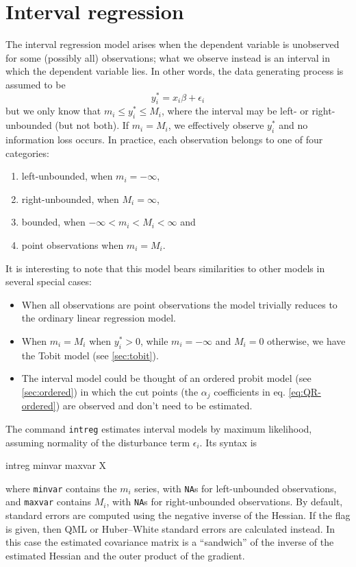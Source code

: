 \section{Interval regression}
\label{sec:intreg}

The interval regression model arises when the dependent variable is
unobserved for some (possibly all) observations; what we observe
instead is an interval in which the dependent variable lies.  In other
words, the data generating process is assumed to be
\[
  y^*_i = x_i \beta + \epsilon_i
\] 
but we only know that $m_i \le y^*_i \le M_i$, where the interval may
be left- or right-unbounded (but not both). If $m_i = M_i$, we
effectively observe $y^*_i$ and no information loss occurs. In
practice, each observation belongs to one of four categories:
\begin{enumerate}
\item left-unbounded, when $m_i = -\infty$,
\item right-unbounded, when $M_i = \infty$,
\item bounded, when $-\infty < m_i < M_i <\infty$ and
\item point observations when $m_i = M_i$.
\end{enumerate}

It is interesting to note that this model bears similarities to other
models in several special cases:
\begin{itemize}
\item When all observations are point observations the model trivially
  reduces to the ordinary linear regression model.
\item When $m_i = M_i$ when $y^*_i> 0$, while $m_i = -\infty$ and $M_i
  = 0$ otherwise, we have the Tobit model (see \ref{sec:tobit}).
\item The interval model could be thought of an ordered probit model
  (see \ref{sec:ordered}) in which the cut points (the $\alpha_j$
  coefficients in eq. \ref{eq:QR-ordered}) are observed and don't need
  to be estimated.
\end{itemize}

The  command \texttt{intreg} estimates interval models by
maximum likelihood, assuming normality of the disturbance term
$\epsilon_i$.  Its syntax is
%
\begin{code}
intreg minvar maxvar X
\end{code}
%
where \texttt{minvar} contains the $m_i$ series, with \texttt{NA}s for
left-unbounded observations, and \texttt{maxvar} contains $M_i$, with
\texttt{NA}s for right-unbounded observations.  By default, standard
errors are computed using the negative inverse of the Hessian.  If the
 flag is given, then QML or Huber--White standard
errors are calculated instead. In this case the estimated covariance
matrix is a ``sandwich'' of the inverse of the estimated Hessian and
the outer product of the gradient.

